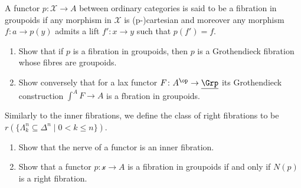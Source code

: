 \begin{Exercise}
	A functor $ p \colon \mathcal{ X } \to A $ between ordinary categories is said to be a fibration in groupoids if any morphism in $ \mathcal{ X } $ is (p-)cartesian and moreover any morphism $ f \colon a \to p ( y ) $ admits a lift $ f' \colon x \to y $ such that $ p ( f' ) = f $.
	\begin{enumerate}[label=(\alph*)]
		\item 
		Show that if $ p $ is a fibration in groupoids, then $ p $ is a Grothendieck fibration whose fibres are groupoids.
		
		\item 
		Show conversely that for a lax functor $ F \colon A^{ \op } \to \underline{ \Grp } $ its Grothendieck construction $ \int^A F \to A $ is a fbration in groupoids.
	\end{enumerate}
	
	Similarly to the inner fibrations, we define the class of right fibrations to be $ r ( \{ \Lambda_k^n \subseteq \Delta^n \mid 0 < k \leq n \} )$.
	
	\begin{enumerate}[label=(\alph*)]
		\item 
		Show that the nerve of a functor is an inner fibration.
		
		\item 
		Show that a functor $ p \colon \mathcal{ x } \to A $ is a fibration in groupoids if and only if $ N ( p ) $ is a right fibration.
	\end{enumerate}
\end{Exercise}

